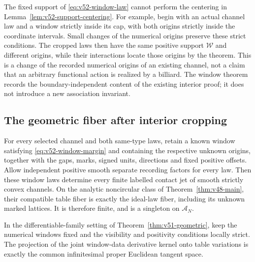 The fixed support of \eqref{eq:v52-window-law} cannot perform the
centering in Lemma~\ref{lem:v52-support-centering}.  For example, begin
with an actual channel law and a window strictly inside its cap, with
both origins strictly inside the coordinate intervals.  Small changes
of the numerical origins preserve these strict conditions.  The cropped
laws then have the same positive support $\mathcal W$ and different
origins, while their interactions locate those origins by the theorem.
This is a change of the recorded numerical origins of an existing
channel, not a claim that an arbitrary functional action is realized
by a billiard.  The window theorem records the boundary-independent
content of the existing interior proof; it does not introduce a new
association invariant.

\subsection{The geometric fiber after interior cropping}
\label{subsec:v52-window-geometry}

\begin{corollary}
\label{cor:v52-window-geometry}
For every selected channel and both same-type laws, retain a known
window satisfying \eqref{eq:v52-window-margin} and containing the
respective unknown origins, together with the gaps, marks, signed units,
directions and fixed positive offsets.  Allow independent positive
smooth separate recording factors for every law.  Then these window
laws determine every finite labelled contact jet of smooth strictly
convex channels.  On the analytic noncircular class of
Theorem~\ref{thm:v48-main}, their compatible table fiber is exactly
the ideal-law fiber, including its unknown marked lattices.  It is
therefore finite, and is a singleton on $\mathscr A_N$.

In the differentiable-family setting of
Theorem~\ref{thm:v51-geometric}, keep the numerical windows fixed and
the visibility and positivity conditions locally strict.  The projection
of the joint window-data derivative kernel onto table variations is
exactly the common infinitesimal proper Euclidean tangent space.
\end{corollary}

